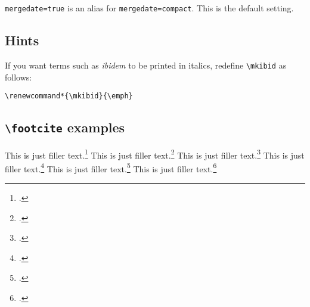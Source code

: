 \documentclass[a4paper]{article}
\newcommand{\cmd}[1]{\texttt{\textbackslash #1}}
\begin{document}
\texttt{mergedate=true} is an alias for \texttt{mergedate=compact}.
This is the default setting.

\subsection*{Hints}

If you want terms such as \emph{ibidem} to be printed in italics,
redefine \cmd{mkibid} as follows:

\begin{verbatim}
\renewcommand*{\mkibid}{\emph}
\end{verbatim}

\subsection*{\cmd{footcite} examples}

This is just filler text.\footcite{aristotle:physics,aristotle:poetics,aristotle:rhetoric,}
This is just filler text.\footcite{companion}
This is just filler text.\footcite{companion}
\clearpage
This is just filler text.\footcite{knuth:ct:c,knuth:ct:b,knuth:ct:d}
This is just filler text.\footcite[55]{companion}
This is just filler text.\footcite[55]{companion}

\clearpage
\printbibliography
\end{document}
